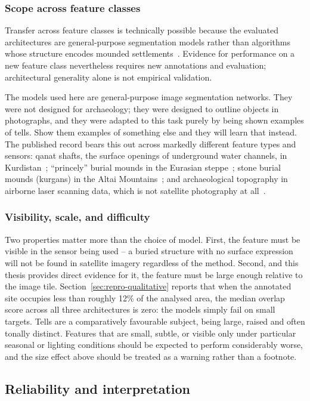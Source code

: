 \subsubsection{Scope across feature classes}
Transfer across feature classes is technically possible because the evaluated
architectures are general-purpose segmentation models rather than algorithms
whose structure encodes mounded settlements~\cite{Fan20,Chen18,Xie21}. Evidence
for performance on a new feature class nevertheless requires new annotations and
evaluation; architectural generality alone is not empirical validation.

The models used here are general-purpose image segmentation networks. They were
not designed for archaeology; they were designed to outline objects in
photographs, and they were adapted to this task purely by being shown examples
of tells. Show them examples of something else and they will learn that
instead. The published record bears this out across markedly different feature
types and sensors: qanat shafts, the surface openings of underground water
channels, in Kurdistan~\cite{Soroush20}; ``princely'' burial mounds in the
Eurasian steppe~\cite{Caspari19}; stone burial mounds (kurgans) in the Altai
Mountains~\cite{Chen21}; and archaeological topography in airborne laser
scanning data, which is not satellite photography at all~\cite{Trier19,Guyot21}.

\subsubsection{Visibility, scale, and difficulty}
Two properties matter more than the choice of model. First, the feature must be
visible in the sensor being used -- a buried structure with no surface
expression will not be found in satellite imagery regardless of the method.
Second, and this thesis provides direct evidence for it, the feature must be
large enough relative to the image tile. Section~\ref{sec:repro-qualitative}
reports that when the annotated site occupies less than roughly 12\% of the
analysed area, the median overlap score across all three architectures is zero:
the models simply fail on small targets. Tells are a comparatively favourable
subject, being large, raised and often tonally distinct. Features that are
small, subtle, or visible only under particular seasonal or lighting conditions
should be expected to perform considerably worse, and the size effect above
should be treated as a warning rather than a footnote.

\subsection{Reliability and interpretation}
\label{sec:arch-reliability}


